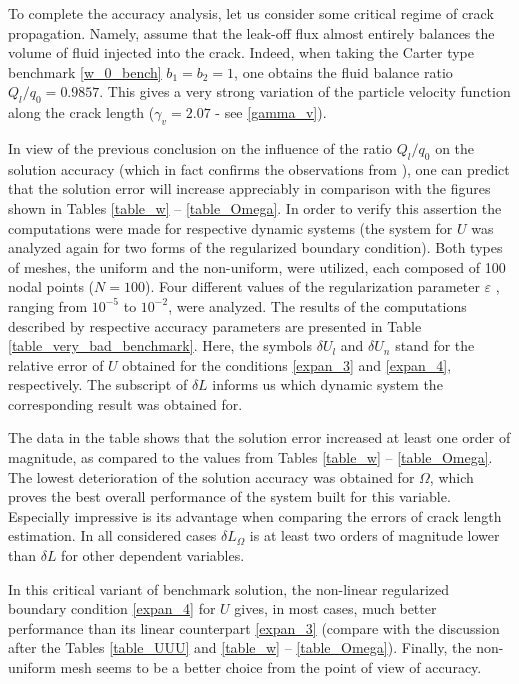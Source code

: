 To complete the accuracy analysis, let us consider some critical
regime of  crack propagation. Namely, assume that the leak-off flux
almost entirely balances the volume of fluid injected into the
crack. Indeed, when taking the Carter type benchmark
\eqref{w_0_bench} $b_1=b_2=1$, one obtains the fluid balance ratio
$Q_l/q_0=0.9857$. This gives a very strong variation of the particle
velocity function along the crack length ($\gamma_v=2.07$ - see \eqref{gamma_v}).

In view of the previous conclusion on the  influence of the ratio $Q_l/q_0$
on the solution accuracy (which in fact confirms the observations from
\citet{MWL}), one can predict that the solution error will increase
appreciably in comparison with the figures shown in Tables
\ref{table_w} -- \ref{table_Omega}. In order to verify this
assertion the computations were made for respective dynamic systems
(the system for $U$ was analyzed again  for two forms of the
regularized boundary condition). Both types of meshes, the uniform
and the non-uniform, were utilized, each composed of 100  nodal
points ($N=100$). Four different values of the regularization
parameter $\varepsilon$ , ranging from $10^{-5}$ to $10^{-2}$, were
analyzed. The results of the computations described by respective
accuracy parameters are presented in Table
\ref{table_very_bad_benchmark}. Here, the symbols $\delta U_l$ and
$\delta U_n$ stand for the relative error of $U$ obtained for the
conditions \eqref{expan_3} and \eqref{expan_4}, respectively. The
subscript of $\delta L$ informs us which dynamic system the
corresponding result was obtained for.

The data in the table shows that the solution error increased at least one order of
magnitude, as compared to the values from Tables \ref{table_w} --
\ref{table_Omega}. The lowest deterioration of the solution accuracy
was obtained for $\Omega$, which proves the best overall performance
of the system built for this variable. Especially impressive is its
advantage when comparing the errors of crack length estimation. In
all considered cases $\delta L_{\Omega}$ is at least two orders of
magnitude lower than $\delta L$ for other dependent variables.

In this critical variant of benchmark solution, the non-linear
regularized boundary condition \eqref{expan_4} for $U$ gives, in
most cases, much better performance than its linear counterpart
\eqref{expan_3} (compare with the discussion after the Tables
\ref{table_UUU} and \ref{table_w} -- \ref{table_Omega}). Finally,
the non-uniform mesh seems to be a better choice from the point of
view of accuracy.

